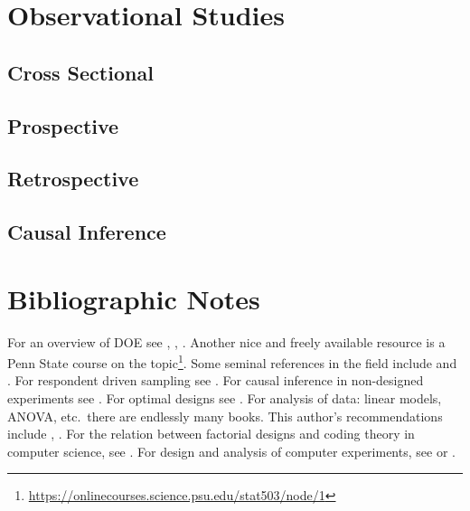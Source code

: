 \section{Observational Studies}
\label{sec:observational}


\subsection{Cross Sectional}
\label{sec:cross_section}


\subsection{Prospective}
\label{sec:prospective}


\subsection{Retrospective}
\label{sec:restospective}

\subsection{Causal Inference}
\label{sec:causal}






\section{Bibliographic Notes}
For an overview of DOE see \cite{cox_theory_2000}, \cite{mason_statistical_2003}, \cite{everitt_cambridge_2010}. 
Another nice and freely available resource is a Penn State course on the topic\footnote{\url{https://onlinecourses.science.psu.edu/stat503/node/1}}. 
Some seminal references in the field include \cite{fisher_design_1960} and \cite{box_statistics_1978}.
For respondent driven sampling see \cite{berchenko_modeling_2013}.
For causal inference in non-designed experiments see \cite{rosenbaum_observational_2002}. 
For optimal designs see \cite{pukelsheim_optimal_1993}.
For analysis of data: linear models, ANOVA, etc.\ there are endlessly many books. This author's recommendations include \cite{hocking_analysis_1985}, \cite{greene_econometric_2003}. 
For the relation between factorial designs and coding theory in computer science, see \cite{hill_first_1986}. 
For design and analysis of computer experiments, see \cite{sacks_design_1989} or \cite{santner_design_2013}.
